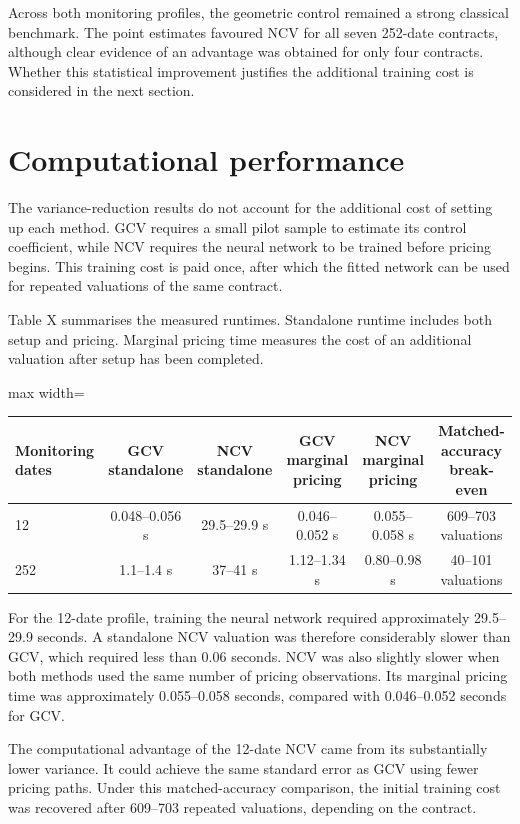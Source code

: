 Across both monitoring profiles, the geometric control remained a strong classical benchmark. The point estimates favoured NCV for all seven 252-date contracts, although clear evidence of an advantage was obtained for only four contracts. Whether this statistical improvement justifies the additional training cost is considered in the next section.

\section{Computational performance}

The variance-reduction results do not account for the additional cost of setting up each method. GCV requires a small pilot sample to estimate its control coefficient, while NCV requires the neural network to be trained before pricing begins. This training cost is paid once, after which the fitted network can be used for repeated valuations of the same contract.

Table X summarises the measured runtimes. Standalone runtime includes both setup and pricing. Marginal pricing time measures the cost of an additional valuation after setup has been completed.

\begin{table}[h]
\centering
\begin{adjustbox}{max width=\textwidth}
\begin{tabular}{lccccc}
\hline
Monitoring dates & GCV standalone & NCV standalone & GCV marginal pricing & NCV marginal pricing & Matched-accuracy break-even \\
\hline
12 & 0.048--0.056 s & 29.5--29.9 s & 0.046--0.052 s & 0.055--0.058 s & 609--703 valuations \\
252 & 1.1--1.4 s & 37--41 s & 1.12--1.34 s & 0.80--0.98 s & 40--101 valuations \\
\hline
\end{tabular}
\end{adjustbox}
\end{table}

For the 12-date profile, training the neural network required approximately 29.5--29.9 seconds. A standalone NCV valuation was therefore considerably slower than GCV, which required less than 0.06 seconds. NCV was also slightly slower when both methods used the same number of pricing observations. Its marginal pricing time was approximately 0.055--0.058 seconds, compared with 0.046--0.052 seconds for GCV.

The computational advantage of the 12-date NCV came from its substantially lower variance. It could achieve the same standard error as GCV using fewer pricing paths. Under this matched-accuracy comparison, the initial training cost was recovered after 609--703 repeated valuations, depending on the contract.

